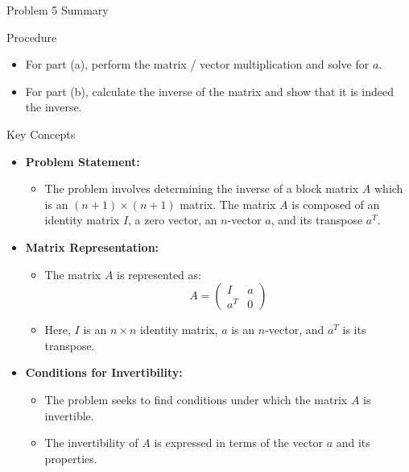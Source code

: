 \begin{summary}{Problem 5 Summary}
    \begin{statement}{Procedure}
        \begin{itemize}
            \item For part (a), perform the matrix / vector multiplication and solve for $a$.
            \item For part (b), calculate the inverse of the matrix and show that it is indeed the inverse.
        \end{itemize}
    \end{statement}
    \begin{statement}{Key Concepts}
        \begin{itemize}
            \item \textbf{Problem Statement:}
            \begin{itemize}
                \item The problem involves determining the inverse of a block matrix $A$ which is an $(n + 1) \times (n + 1)$ matrix. The matrix $A$ is composed of an identity matrix 
                $I$, a zero vector, an $n$-vector $a$, and its transpose $a^T$.
            \end{itemize}
            \item \textbf{Matrix Representation:}
            \begin{itemize}
                \item The matrix $A$ is represented as:
                \begin{equation*}
                    A = 
                    \begin{pmatrix} 
                        I & a \\ 
                        a^T & 0 
                    \end{pmatrix}
                \end{equation*}
                \item Here, $I$ is an $n \times n$ identity matrix, $a$ is an $n$-vector, and $a^T$ is its transpose.
            \end{itemize}
            \item \textbf{Conditions for Invertibility:}
            \begin{itemize}
                \item The problem seeks to find conditions under which the matrix $A$ is invertible.
                \item The invertibility of $A$ is expressed in terms of the vector $a$ and its properties.

\end{itemize}
\end{itemize}
\end{statement}
\end{summary}
